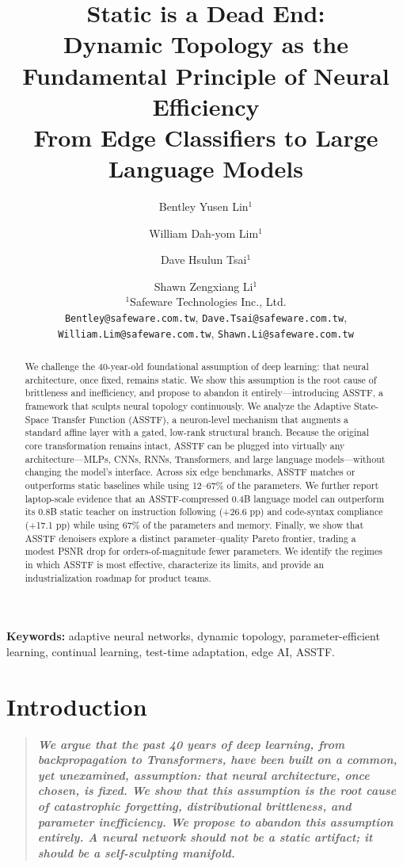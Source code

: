 \documentclass[11pt,a4paper]{article}
\title{\textbf{Static is a Dead End:}\\[0.3em]
\Large Dynamic Topology as the Fundamental Principle of Neural Efficiency\\[0.2em]
\large From Edge Classifiers to Large Language Models}
\author{
Bentley Yusen Lin$^{1}$ \and William Dah-yom Lim$^{1}$ \and Dave Hsulun Tsai$^{1}$ \and Shawn Zengxiang Li$^{1}$\\[0.5em]
\normalsize $^{1}$Safeware Technologies Inc., Ltd.\\[0.2em]
\normalsize \texttt{Bentley@safeware.com.tw}, \texttt{Dave.Tsai@safeware.com.tw},\\
\normalsize \texttt{William.Lim@safeware.com.tw}, \texttt{Shawn.Li@safeware.com.tw}
}
\date{}
\theoremstyle{definition}
\begin{document}
\maketitle

\begin{abstract}
We challenge the 40-year-old foundational assumption of deep learning: that neural architecture, once fixed, remains static. We show this assumption is the root cause of brittleness and inefficiency, and propose to abandon it entirely---introducing ASSTF, a framework that sculpts neural topology continuously. We analyze the Adaptive State-Space Transfer Function (ASSTF), a neuron-level mechanism that augments a standard affine layer with a gated, low-rank structural branch. Because the original core transformation remains intact, ASSTF can be plugged into virtually any architecture---MLPs, CNNs, RNNs, Transformers, and large language models---without changing the model's interface. Across six edge benchmarks, ASSTF matches or outperforms static baselines while using 12--67\% of the parameters. We further report laptop-scale evidence that an ASSTF-compressed 0.4B language model can outperform its 0.8B static teacher on instruction following (+26.6 pp) and code-syntax compliance (+17.1 pp) while using 67\% of the parameters and memory. Finally, we show that ASSTF denoisers explore a distinct parameter--quality Pareto frontier, trading a modest PSNR drop for orders-of-magnitude fewer parameters. We identify the regimes in which ASSTF is most effective, characterize its limits, and provide an industrialization roadmap for product teams.
\end{abstract}

\textbf{Keywords:} adaptive neural networks, dynamic topology, parameter-efficient learning, continual learning, test-time adaptation, edge AI, ASSTF.

\section{Introduction}
\label{sec:intro}

\begin{quote}
\itshape\bfseries
We argue that the past 40 years of deep learning, from backpropagation to Transformers, have been built on a common, yet unexamined, assumption: that neural architecture, once chosen, is fixed. We show that this assumption is the root cause of catastrophic forgetting, distributional brittleness, and parameter inefficiency. We propose to abandon this assumption entirely. A neural network should not be a static artifact; it should be a self-sculpting manifold.
\end{quote}
\end{document}
